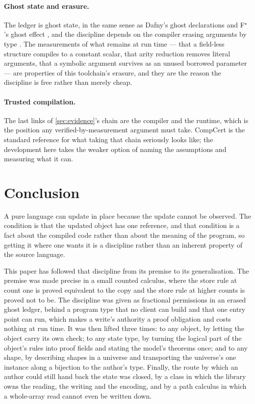 \documentclass[11pt,a4paper]{article}
\theoremstyle{definition}
\theoremstyle{plain}
\begin{document}
\paragraph{Ghost state and erasure.}
The ledger is ghost state, in the same sense as Dafny's ghost declarations
\cite{leino2010dafny} and F$^{\star}$'s ghost effect \cite{swamy2016fstar}, and the
discipline depends on the compiler erasing arguments by type
\cite{gilbert2019proofirrelevance}. The measurements of what remains at run time
--- that a field-less structure compiles to a constant scalar, that arity
reduction removes literal arguments, that a symbolic argument survives as an
unused borrowed parameter --- are properties of this toolchain's erasure, and
they are the reason the discipline is free rather than merely cheap.

\paragraph{Trusted compilation.}
The last links of \cref{sec:evidence}'s chain are the compiler and the runtime,
which is the position any verified-by-measurement argument must take. CompCert
\cite{leroy2009compcert} is the standard reference for what taking that chain
seriously looks like; the development here takes the weaker option of naming the
assumptions and measuring what it can.

\section{Conclusion}\label{sec:conclusion}

A pure language can update in place because the update cannot be observed. The
condition is that the updated object has one reference, and that condition is a
fact about the compiled code rather than about the meaning of the program, so
getting it where one wants it is a discipline rather than an inherent property
of the source language.

This paper has followed that discipline from its premise to its generalisation.
The premise was made precise in a small counted calculus, where the store rule
at count one is proved equivalent to the copy and the store rule at higher counts
is proved not to be. The discipline was given as fractional permissions in an
erased ghost ledger, behind a program type that no client can build and that one
entry point can run, which makes a write's authority a proof obligation and
costs nothing at run time. It was then lifted three times: to any object, by
letting the object carry its own check; to any state type, by turning the logical
part of the object's rules into proof fields and stating the model's theorems
once; and to any shape, by describing shapes in a universe and transporting the
universe's one instance along a bijection to the author's type. Finally, the
route by which an author could still hand back the state was closed, by a class
in which the library owns the reading, the writing and the encoding, and by a
path calculus in which a whole-array read cannot even be written down.
\end{document}
